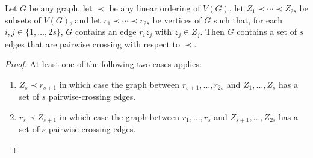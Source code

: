 \documentclass[kpfonts]{patmorin}
\begin{document}
\begin{lem}
    Let $G$ be any graph, let $\prec$ be any linear ordering of $V(G)$,  let $Z_{1}\prec\cdots\prec Z_{2s}$ be subsets of $V(G)$, and let $r_1\prec\cdots\prec r_{2s}$ be vertices of $G$ such that, for each $i,j\in\{1,\ldots,2s\}$, $G$ contains an edge $r_iz_j$ with $z_j\in Z_j$. Then $G$ contains a set of $s$ edges that are pairwise crossing with respect to $\prec$.
\end{lem}

\begin{proof}
    At least one of the following two cases applies:
    \begin{enumerate}
        \item $Z_s\prec r_{s+1}$ in which case the graph between $r_{s+1},\ldots,r_{2s}$ and $Z_1,\ldots,Z_s$ has a set of $s$ pairwise-crossing edges.
        \item $r_{s}\prec Z_{s+1}$ in which case the graph between $r_1,\ldots,r_s$ and $Z_{s+1},\ldots,Z_{2s}$ has a set of $s$ pairwise-crossing edges. \qedhere
    \end{enumerate}
\end{proof}
\end{document}
